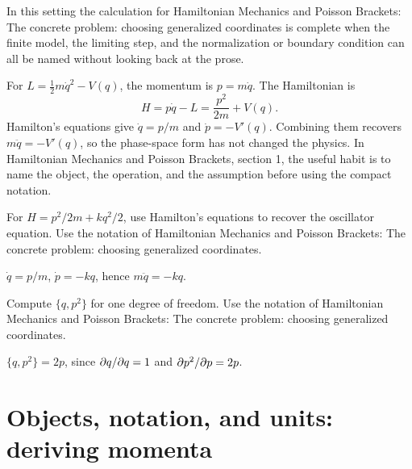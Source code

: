 In this setting the calculation for Hamiltonian Mechanics and Poisson Brackets: The concrete problem: choosing generalized coordinates is complete when the finite model, the limiting step, and the normalization or boundary condition can all be named without looking back at the prose.




\begin{example}
For \(L=\frac12m\dot q^2-V(q)\), the momentum is \(p=m\dot q\).  The Hamiltonian is
\[
  H=p\dot q-L=\frac{p^2}{2m}+V(q).
\]
Hamilton's equations give \(\dot q=p/m\) and \(\dot p=-V'(q)\).  Combining them recovers \(m\ddot q=-V'(q)\), so the phase-space form has not changed the physics.  In Hamiltonian Mechanics and Poisson Brackets, section 1, the useful habit is to name the object, the operation, and the assumption before using the compact notation.
\end{example}



\begin{exercise}
For \(H=p^2/2m+kq^2/2\), use Hamilton's equations to recover the oscillator equation.  Use the notation of Hamiltonian Mechanics and Poisson Brackets: The concrete problem: choosing generalized coordinates.
\begin{answer}
\(\dot q=p/m\), \(\dot p=-kq\), hence \(m\ddot q=-kq\).
\end{answer}
\end{exercise}

\begin{exercise}
Compute \(\{q,p^2\}\) for one degree of freedom.  Use the notation of Hamiltonian Mechanics and Poisson Brackets: The concrete problem: choosing generalized coordinates.
\begin{answer}
\(\{q,p^2\}=2p\), since \(\partial q/\partial q=1\) and \(\partial p^2/\partial p=2p\).
\end{answer}
\end{exercise}



\section{Objects, notation, and units: deriving momenta}













